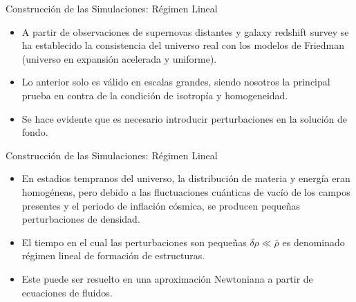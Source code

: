 \documentclass[8pt,fleqn]{beamer}
\begin{document}
\begin{frame}
\begin{block}{Construcción de las Simulaciones: Régimen Lineal}\justifying

\begin{itemize}
\item A partir de observaciones de supernovas distantes y galaxy redshift 
survey se ha establecido la consistencia del universo real con los modelos 
de Friedman (universo en expansión acelerada y uniforme). 


\item Lo anterior solo es válido en escalas grandes, siendo nosotros la 
principal prueba en contra de la condición de isotropía y homogeneidad.


\item Se hace evidente que es necesario introducir perturbaciones en la 
solución de fondo.
\end{itemize}

\end{block}
\end{frame}
\begin{frame}
\begin{block}{Construcción de las Simulaciones: Régimen Lineal}\justifying

\begin{itemize}
\item En estadios tempranos del universo, la distribución de materia y 
energía eran homogéneas, pero debido a las fluctuaciones cuánticas de vacío
de los campos presentes y el periodo de inflación cósmica, se producen 
pequeñas perturbaciones de densidad.
\item El tiempo en el cual las perturbaciones son pequeñas $\delta \rho \ll 
\bar \rho$ es denominado régimen lineal de formación de estructuras.
\item Este puede ser resuelto en una aproximación Newtoniana a partir de 
ecuaciones de fluidos.
\end{itemize}

\end{block}
\end{frame}
\end{document}
